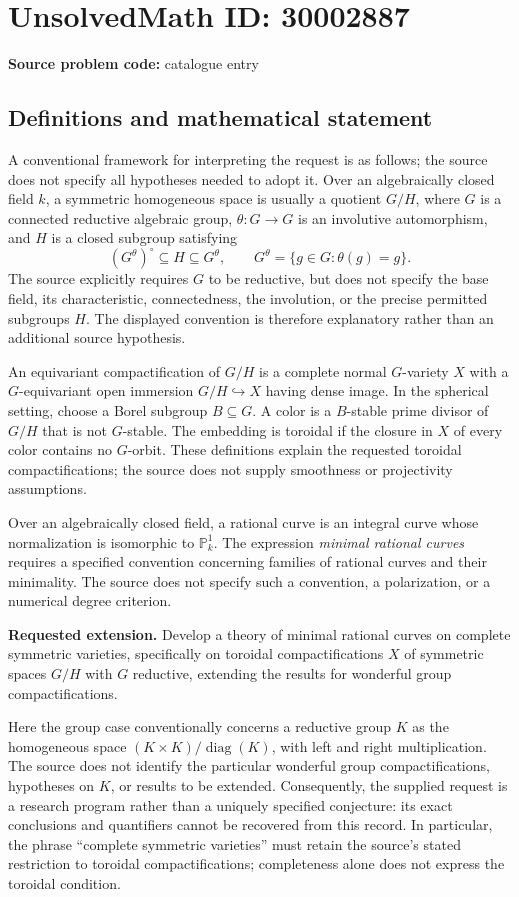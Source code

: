 \documentclass[11pt]{article}
\begin{document}
\section*{UnsolvedMath ID: 30002887}
\textbf{Source problem code:} catalogue entry
\subsection{Definitions and mathematical statement}
A conventional framework for interpreting the request is as follows; the source does not specify all hypotheses needed to adopt it. Over an algebraically closed field \(k\), a symmetric homogeneous space is usually a quotient \(G/H\), where \(G\) is a connected reductive algebraic group, \(\theta\colon G\to G\) is an involutive automorphism, and \(H\) is a closed subgroup satisfying
\[
(G^\theta)^\circ\subseteq H\subseteq G^\theta,
\qquad G^\theta=\{g\in G:\theta(g)=g\}.
\]
The source explicitly requires \(G\) to be reductive, but does not specify the base field, its characteristic, connectedness, the involution, or the precise permitted subgroups \(H\). The displayed convention is therefore explanatory rather than an additional source hypothesis.

An equivariant compactification of \(G/H\) is a complete normal \(G\)-variety \(X\) with a \(G\)-equivariant open immersion \(G/H\hookrightarrow X\) having dense image. In the spherical setting, choose a Borel subgroup \(B\subseteq G\). A color is a \(B\)-stable prime divisor of \(G/H\) that is not \(G\)-stable. The embedding is toroidal if the closure in \(X\) of every color contains no \(G\)-orbit. These definitions explain the requested toroidal compactifications; the source does not supply smoothness or projectivity assumptions.

Over an algebraically closed field, a rational curve is an integral curve whose normalization is isomorphic to \(\mathbb P^1_k\). The expression \emph{minimal rational curves} requires a specified convention concerning families of rational curves and their minimality. The source does not specify such a convention, a polarization, or a numerical degree criterion.

\textbf{Requested extension.} Develop a theory of minimal rational curves on complete symmetric varieties, specifically on toroidal compactifications \(X\) of symmetric spaces \(G/H\) with \(G\) reductive, extending the results for wonderful group compactifications.

Here the group case conventionally concerns a reductive group \(K\) as the homogeneous space \((K\times K)/\operatorname{diag}(K)\), with left and right multiplication. The source does not identify the particular wonderful group compactifications, hypotheses on \(K\), or results to be extended. Consequently, the supplied request is a research program rather than a uniquely specified conjecture: its exact conclusions and quantifiers cannot be recovered from this record. In particular, the phrase ``complete symmetric varieties'' must retain the source's stated restriction to toroidal compactifications; completeness alone does not express the toroidal condition.
\end{document}
